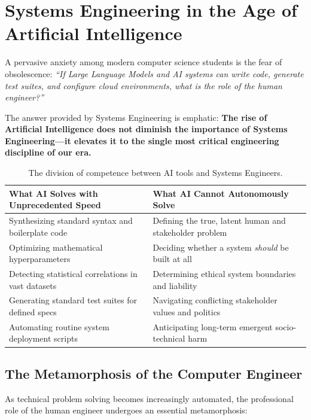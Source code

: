 \section{Systems Engineering in the Age of Artificial Intelligence}
\label{sec:se_ai_era}

A pervasive anxiety among modern computer science students is the fear of obsolescence: \textit{``If Large Language Models and AI systems can write code, generate test suites, and configure cloud environments, what is the role of the human engineer?''}

The answer provided by Systems Engineering is emphatic: \textbf{The rise of Artificial Intelligence does not diminish the importance of Systems Engineering—it elevates it to the single most critical engineering discipline of our era.}

\begin{table}[htbp]
\centering
\small
\renewcommand{\arraystretch}{1.3}
\begin{tabularx}{\textwidth}{p{6.0cm}X}
\toprule
\textbf{What AI Solves with Unprecedented Speed} & \textbf{What AI Cannot Autonomously Solve} \\
\midrule
Synthesizing standard syntax and boilerplate code & Defining the true, latent human and stakeholder problem \\
Optimizing mathematical hyperparameters & Deciding whether a system \textit{should} be built at all \\
Detecting statistical correlations in vast datasets & Determining ethical system boundaries and liability \\
Generating standard test suites for defined specs & Navigating conflicting stakeholder values and politics \\
Automating routine system deployment scripts & Anticipating long-term emergent socio-technical harm \\
\bottomrule
\end{tabularx}
\caption{The division of competence between AI tools and Systems Engineers.}
\label{tab:ai_vs_se}
\end{table}

\subsection{The Metamorphosis of the Computer Engineer}
As technical problem solving becomes increasingly automated, the professional role of the human engineer undergoes an essential metamorphosis:


